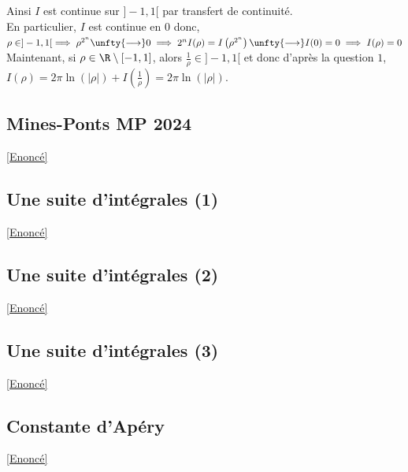 \documentclass{book}
\begin{document}
\begin{enumerate}[leftmargin=*\\]
		Ainsi $I$ est continue sur $]-1,1[$ par transfert de continuité.\\
		En particulier, $I$ est continue en $0$ donc,\\
		$\rho\in ]-1,1[\implies \rho^{2^n}\unfty{\longrightarrow}0\implies 
		2^nI(\rho)=I\left(\rho^{2^n}\right)\unfty{\longrightarrow}I(0)=0\implies I(\rho)=0$\\
		Maintenant, si $\rho\in \R\setminus[-1,1]$, alors $\displaystyle\frac{1}{\rho}\in ]-1,1[$ et donc d'après la question $1$, $I(\rho)=2\pi\ln(|\rho|)+I\left(\displaystyle\frac{1}{\rho}\right)=2\pi\ln(|\rho|)$.
	\end{enumerate}
	
	\subsection{Mines-Ponts MP 2024}
	\label{sec:mines-ponts-mp-2024-chaima-prime}
	\textcolor{blue}{\hyperref[chaima]{[Enoncé]}}\\
	
	\subsection{Une suite d'intégrales (1)}
	\label{sec:une-suite-dintegrales-1}
	\textcolor{blue}{\hyperref[suiteintégrale1]{[Enoncé]}}\\
	
	\subsection{Une suite d'intégrales (2)}
	\label{sec:une-suite-dintegrales-2}
	\textcolor{blue}{\hyperref[suiteintégrale2]{[Enoncé]}}\\
	
	\subsection{Une suite d'intégrales (3)}
	\label{sec:une-suite-dintegrales-3}
	\textcolor{blue}{\hyperref[suiteintégrale3]{[Enoncé]}}\\
	
	\subsection{Constante d'Apéry}
	\label{Constante d'Apéry corrigé}
	\textcolor{blue}{\hyperref[Constante d'Apéry]{[Enoncé]}}\\
	
\end{document}
